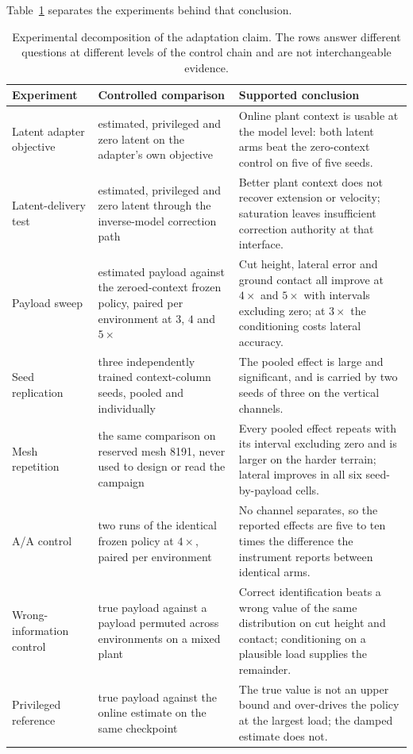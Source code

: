 Table~\ref{tab:concl:adaptation-evidence} separates the experiments behind that
conclusion.

\begin{table}[htbp]
  \centering
  \caption{Experimental decomposition of the adaptation claim. The rows answer
  different questions at different levels of the control chain and are not
  interchangeable evidence.}
  \label{tab:concl:adaptation-evidence}
  \small
  \setlength{\tabcolsep}{4pt}
  \begin{tabular}{@{}p{}p{}p{}@{}}
    \toprule
    Experiment & Controlled comparison & Supported conclusion \\
    \midrule
    Latent adapter objective
      & estimated, privileged and zero latent on the adapter's own objective
      & Online plant context is usable at the model level: both latent arms beat the zero-context control on five of five seeds. \\
    Latent-delivery test
      & estimated, privileged and zero latent through the inverse-model correction path
      & Better plant context does not recover extension or velocity; saturation leaves insufficient correction authority at that interface. \\
    Payload sweep
      & estimated payload against the zeroed-context frozen policy, paired per environment at $3$, $4$ and $5\times$
      & Cut height, lateral error and ground contact all improve at $4\times$ and $5\times$ with intervals excluding zero; at $3\times$ the conditioning costs lateral accuracy. \\
    Seed replication
      & three independently trained context-column seeds, pooled and individually
      & The pooled effect is large and significant, and is carried by two seeds of three on the vertical channels. \\
    Mesh repetition
      & the same comparison on reserved mesh 8191, never used to design or read the campaign
      & Every pooled effect repeats with its interval excluding zero and is larger on the harder terrain; lateral improves in all six seed-by-payload cells. \\
    A/A control
      & two runs of the identical frozen policy at $4\times$, paired per environment
      & No channel separates, so the reported effects are five to ten times the difference the instrument reports between identical arms. \\
    Wrong-information control
      & true payload against a payload permuted across environments on a mixed plant
      & Correct identification beats a wrong value of the same distribution on cut height and contact; conditioning on a plausible load supplies the remainder. \\
    Privileged reference
      & true payload against the online estimate on the same checkpoint
      & The true value is not an upper bound and over-drives the policy at the largest load; the damped estimate does not. \\
    \bottomrule
  \end{tabular}
\end{table}

